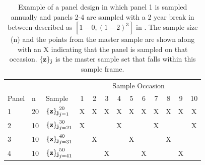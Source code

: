 \documentclass[titlepage]{article}
\begin{document}
\begin{table}[H]
	\caption{Example of a panel design in which panel 1 is sampled annually and panels 2-4 are sampled with a 2 year break in between described as $[1-0,(1-2)^3]$ in \cite{Mcdonald2003}. The sample size (n) and the points from the master sample are shown along with an X indicating that the panel is sampled on that occasion. ${\{\bf z\}_j}$ is the master sample set that falls within this sample frame.}
	\begin{tabular}{l l l c c c c c c c c c c }
	\hline
	& & & \multicolumn{10}{c}{Sample Occasion}\\ 
	\cline{4-13}
	Panel & n & Sample & 1 & 2 & 3 & 4 & 5 & 6 & 7 & 8 & 9 & 10 \\ 
	\hline
	1 & 20 & ${\{\bf z\}_j}_{j=1}^{20}$ & X & X & X & X & X & X & X & X & X & X \\
	2 & 10 & ${\{\bf z\}_j}_{j=21}^{30}$ & X &   &  &X &   &   & X &   &  & X \\
	3 & 10 & ${\{\bf z\}_j}_{j=31}^{40}$ &  & X &  &  & X &   &   & X &  &   \\
	4 & 10 & ${\{\bf z\}_j}_{j=41}^{50}$ &  &   &  X  &   &   & X &   &  & X & \\
	\hline
\end{tabular}  
	\label{Panel}
\end{table}

\newpage
\end{document}
